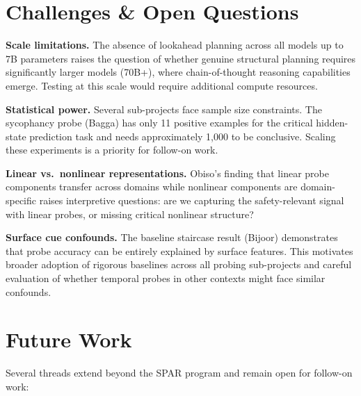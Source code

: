 \documentclass[final]{sparreport}
\begin{document}
\section{Challenges \& Open Questions}

\textbf{Scale limitations.} The absence of lookahead planning across all models up to 7B parameters raises the question of whether genuine structural planning requires significantly larger models (70B+), where chain-of-thought reasoning capabilities emerge. Testing at this scale would require additional compute resources.

\textbf{Statistical power.} Several sub-projects face sample size constraints. The sycophancy probe (Bagga) has only 11 positive examples for the critical hidden-state prediction task and needs approximately 1,000 to be conclusive. Scaling these experiments is a priority for follow-on work.

\textbf{Linear vs.\ nonlinear representations.} Obiso's finding that linear probe components transfer across domains while nonlinear components are domain-specific raises interpretive questions: are we capturing the safety-relevant signal with linear probes, or missing critical nonlinear structure?

\textbf{Surface cue confounds.} The baseline staircase result (Bijoor) demonstrates that probe accuracy can be entirely explained by surface features. This motivates broader adoption of rigorous baselines across all probing sub-projects and careful evaluation of whether temporal probes in other contexts might face similar confounds.

\section{Future Work}

Several threads extend beyond the SPAR program and remain open for follow-on work:
\end{document}
